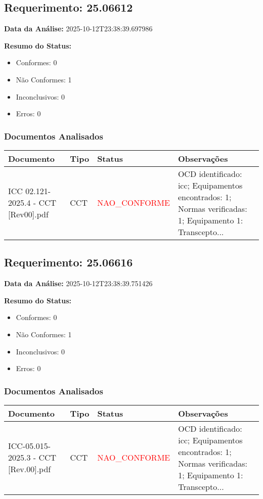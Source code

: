 \documentclass[12pt,a4paper]{article}
\begin{document}
\subsection{Requerimento: 25.06612}

\textbf{Data da Análise:} 2025-10-12T23:38:39.697986

\textbf{Resumo do Status:}
\begin{itemize}
    \item Conformes: 0
    \item Não Conformes: 1
    \item Inconclusivos: 0
    \item Erros: 0
\end{itemize}

\subsubsection{Documentos Analisados}

\begin{longtable}{|p{4cm}|p{2cm}|p{2cm}|p{6cm}|}
\hline
\textbf{Documento} & \textbf{Tipo} & \textbf{Status} & \textbf{Observações} \\
\hline
\endhead
ICC 02.121-2025.4 - CCT [Rev00].pdf & CCT & \textcolor{red}{NAO\_CONFORME} & OCD identificado: icc; Equipamentos encontrados: 1; Normas verificadas: 1; Equipamento 1: Transcepto... \\
\hline
\end{longtable}


\subsection{Requerimento: 25.06616}

\textbf{Data da Análise:} 2025-10-12T23:38:39.751426

\textbf{Resumo do Status:}
\begin{itemize}
    \item Conformes: 0
    \item Não Conformes: 1
    \item Inconclusivos: 0
    \item Erros: 0
\end{itemize}

\subsubsection{Documentos Analisados}

\begin{longtable}{|p{4cm}|p{2cm}|p{2cm}|p{6cm}|}
\hline
\textbf{Documento} & \textbf{Tipo} & \textbf{Status} & \textbf{Observações} \\
\hline
\endhead
ICC-05.015-2025.3 - CCT [Rev.00].pdf & CCT & \textcolor{red}{NAO\_CONFORME} & OCD identificado: icc; Equipamentos encontrados: 1; Normas verificadas: 1; Equipamento 1: Transcepto... \\
\hline
\end{longtable}
\end{document}
